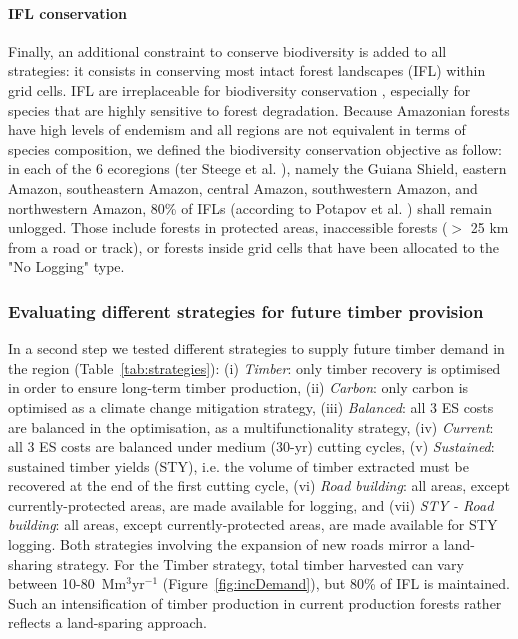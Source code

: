 \documentclass{article}
\begin{document}
\paragraph{IFL conservation}

Finally, an additional constraint  to conserve biodiversity is added to all strategies: it consists in conserving most intact forest landscapes (IFL) within grid cells. IFL are irreplaceable for biodiversity conservation \cite{Gibson2011}, especially for species that are highly sensitive to forest degradation. Because Amazonian forests have high levels of endemism and all regions are not equivalent in terms of species composition, we defined the biodiversity conservation objective as follow: in each of the 6 ecoregions (ter Steege et al. \cite{TerSteege2013}), namely the Guiana Shield, eastern Amazon, southeastern Amazon, central Amazon, southwestern Amazon, and northwestern Amazon, 80\% of IFLs (according to Potapov et al. \cite{Potapov2017}) shall remain unlogged. Those include forests in protected areas, inaccessible forests ($>$ 25 km from a road or track), or forests inside grid cells that have been allocated to the "No Logging" type. 



\subsubsection{Evaluating different strategies for future timber provision}
\label{sec:strategies}

In a second step we tested different strategies to supply future timber demand in the region (Table~\ref{tab:strategies}): (i) \textit{Timber}: only timber recovery is optimised in order to ensure long-term timber production, (ii) \textit{Carbon}: only carbon is optimised as a climate change mitigation strategy, (iii) \textit{Balanced}: all 3 ES costs are balanced in the optimisation, as a multifunctionality strategy, (iv) \textit{Current}: all 3 ES costs are balanced under medium (30-yr) cutting cycles, (v) \textit{Sustained}: sustained timber yields (STY), i.e. the volume of timber extracted must be recovered at the end of the first cutting cycle, (vi) \textit{Road building}: all areas, except currently-protected areas, are made available for logging, and (vii) \textit{STY - Road building}: all areas, except currently-protected areas, are made available for STY logging. Both strategies involving the expansion of new roads mirror a land-sharing strategy. For the Timber strategy, total timber harvested can vary between 10-80~Mm$^3$yr$^{-1}$ (Figure~\ref{fig:incDemand}), but 80\% of IFL is maintained. Such an intensification of timber production in current production forests rather reflects a land-sparing approach.
\end{document}
